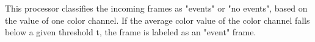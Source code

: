 This processor classifies the incoming frames as "events" or "no events", based on the value of one color channel. If the average color value of the color channel falls below a given threshold t, the frame is labeled as an "event" frame.